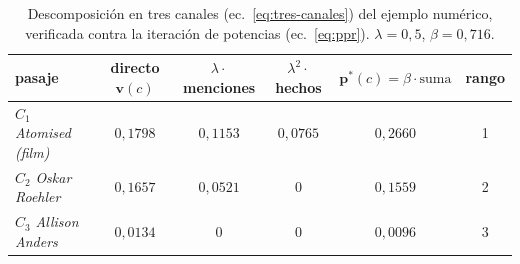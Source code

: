 \documentclass[11pt,a4paper]{article}
\begin{document}
\begin{table}[t]
\centering\footnotesize
\caption{Descomposición en tres canales (ec.~\ref{eq:tres-canales}) del
ejemplo numérico, verificada contra la iteración de potencias
(ec.~\ref{eq:ppr}). $\lambda=0{,}5$, $\beta=0{,}716$.}
\label{tab:ppr-canales}
\begin{tabular}{lccccc}
\toprule
pasaje & directo $\mathbf{v}(c)$ & $\lambda\cdot$menciones &
$\lambda^{2}\cdot$hechos & $\mathbf{p}^{*}(c)=\beta\cdot\text{suma}$ & rango\\
\midrule
$C_1$ \emph{Atomised (film)} & $0{,}1798$ & $0{,}1153$ & $0{,}0765$ & $0{,}2660$ & 1\\
$C_2$ \emph{Oskar Roehler}   & $0{,}1657$ & $0{,}0521$ & $0$        & $0{,}1559$ & 2\\
$C_3$ \emph{Allison Anders}  & $0{,}0134$ & $0$        & $0$        & $0{,}0096$ & 3\\
\bottomrule
\end{tabular}
\end{table}
\end{document}
